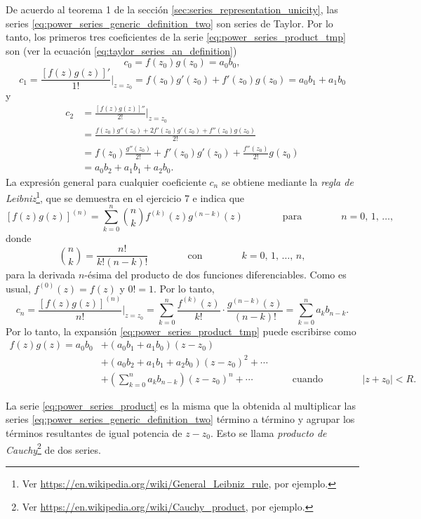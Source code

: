 \documentclass[a4paper]{report}
\begin{document}
De acuerdo al teorema 1 de la sección \ref{sec:series_representation_unicity}, las series \ref{eq:power_series_generic_definition_two} son series de Taylor. Por lo tanto, los primeros tres coeficientes de la serie \ref{eq:power_series_product_tmp} son (ver la ecuación \ref{eq:taylor_series_an_definition})
\[
 c_0=f(z_0)g(z_0)=a_0b_0,
\]
\[
 c_1=\frac{[f(z)g(z)]'}{1!}\bigg|_{z=z_0}=f(z_0)g'(z_0)+f'(z_0)g(z_0)=a_0b_1+a_1b_0
\]
y
\begin{align*}
 c_2&=\frac{[f(z)g(z)]''}{2!}\bigg|_{z=z_0}\\
  &=\frac{f(z_0)g''(z_0)+2f'(z_0)g'(z_0)+f''(z_0)g(z_0)}{2!}\\
  &=f(z_0)\frac{g''(z_0)}{2!}+f'(z_0)g'(z_0)+\frac{f''(z_0)}{2!}g(z_0)\\
  &=a_0b_2+a_1b_1+a_2b_0.
\end{align*}
La expresión general para cualquier coeficiente \(c_n\) se obtiene mediante la \emph{regla de Leibniz}\footnote{Ver \url{https://en.wikipedia.org/wiki/General_Leibniz_rule}, por ejemplo.}, que se demuestra en el ejercicio 7 e indica que
\begin{equation}\label{eq:leibniz_general_rule}
 [f(z)g(z)]^{(n)}=\sum_{k=0}^n\binom{n}{k}f^{(k)}(z)g^{(n-k)}(z)
 \qquad\qquad\textrm{para}\qquad\qquad
 n=0,\,1,\,\dots, 
\end{equation}
donde
\[
 \binom{n}{k}=\frac{n!}{k!(n-k)!}
 \qquad\qquad\textrm{con}\qquad\qquad
 k=0,\,1,\,\dots,\,n,
\]
para la derivada \(n\)-ésima del producto de dos funciones diferenciables. Como es usual, \(f^{(0)}(z)=f(z)\) y \(0!=1\). Por lo tanto,
\[
 c_n=\frac{[f(z)g(z)]^{(n)}}{n!}\bigg|_{z=z_0}=\sum_{k=0}^n\frac{f^{(k)}(z)}{k!}\cdot\frac{g^{(n-k)}(z)}{(n-k)!}
  =\sum_{k=0}^na_kb_{n-k}.
\]
Por lo tanto, la expansión \ref{eq:power_series_product_tmp} puede escribirse como
\begin{equation}\label{eq:power_series_product}
 \begin{aligned}
  f(z)g(z)=a_0b_0&+(a_0b_1+a_1b_0)(z-z_0)\\
    &+(a_0b_2+a_1b_1+a_2b_0)(z-z_0)^2+\cdots\\ 
    &+\left(\sum_{k=0}^na_kb_{n-k}\right)(z-z_0)^n+\cdots
    \qquad\qquad\textrm{cuando}\qquad\qquad
   |z+z_0|<R. 
 \end{aligned} 
\end{equation}

La serie \ref{eq:power_series_product} es la misma que la obtenida al multiplicar las series \ref{eq:power_series_generic_definition_two} término a término y agrupar los términos resultantes de igual potencia de \(z-z_0\). Esto se llama \emph{producto de Cauchy}\footnote{Ver \url{https://en.wikipedia.org/wiki/Cauchy_product}, por ejemplo.} de dos series.
\end{document}
